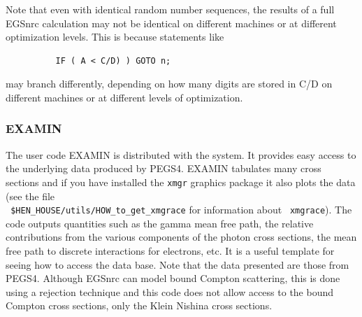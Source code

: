 Note that even with identical random number sequences, the results of a
full EGSnrc calculation may not be identical on different machines or at
different optimization levels.  This is because statements like
\begin{verbatim}
          IF ( A < C/D) ) GOTO n;
\end{verbatim}
may branch differently, depending on how many digits are stored in C/D on
different machines or at different levels of optimization.

\subsubsection{EXAMIN}
\label{examin}
The user code EXAMIN is distributed with the system. It provides easy
access to the underlying data produced by PEGS4. EXAMIN tabulates many
cross sections and if you have installed the
{\tt xmgr} graphics package it also plots the data (see the file\\ {\tt
\$HEN\_HOUSE/utils/HOW\_to\_get\_xmgrace} for information about {\tt
xmgrace}).
The code outputs quantities such as the gamma mean free path, the relative
contributions from the various components of the photon cross sections, the
mean free path to discrete interactions for electrons, etc.  It is a useful
template for seeing how to access the data base.  Note that the data
presented are those from PEGS4. Although EGSnrc can model bound Compton
scattering, this is done using a rejection technique and this code does not
allow access to the bound Compton cross sections, only the Klein Nishina
cross sections.



